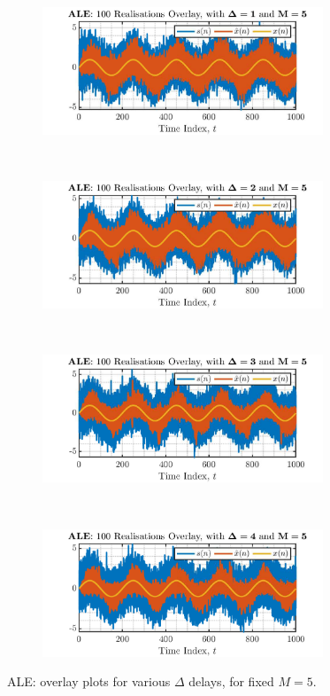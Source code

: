 \begin{enumerate}[label=\alph*), leftmargin=*]
\begin{figure}[h]
    \centering
    \begin{subfigure}{0.49\textwidth}
        \centering
        \includegraphics[height=1.5in]{report/adaptive-signal-processing/adaptive-noise-cancellation/assets/a/ale_overlay-Delta_1}
    \end{subfigure}
    ~
    \begin{subfigure}{0.49\textwidth}
        \centering
        \includegraphics[height=1.5in]{report/adaptive-signal-processing/adaptive-noise-cancellation/assets/a/ale_overlay-Delta_2}
    \end{subfigure}
    ~
    ~
    \begin{subfigure}{0.49\textwidth}
        \centering
        \includegraphics[height=1.5in]{report/adaptive-signal-processing/adaptive-noise-cancellation/assets/a/ale_overlay-Delta_3}
    \end{subfigure}
    ~
    \begin{subfigure}{0.49\textwidth}
        \centering
        \includegraphics[height=1.5in]{report/adaptive-signal-processing/adaptive-noise-cancellation/assets/a/ale_overlay-Delta_4}
    \end{subfigure}
    \caption{ALE: overlay plots for various $\Delta$ delays, for fixed $M=5$.}
    \label{fig:3_3_a_1}
\end{figure}


\end{enumerate}
